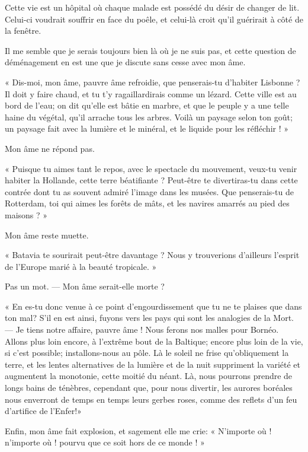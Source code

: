 Cette vie est un hôpital où chaque malade est possédé du désir de
changer de lit. Celui{}-ci voudrait souffrir en face du poêle, et
celui{}-là croit qu’il guérirait à côté de la fenêtre.

Il me semble que je serais toujours bien là où je ne suis pas, et cette
question de déménagement en est une que je discute sans cesse avec mon
âme.

« Dis{}-moi, mon âme, pauvre âme refroidie, que penserais{}-tu
d’habiter Lisbonne ? Il doit y faire chaud, et tu
t’y ragaillardirais comme un lézard. Cette ville est
au bord de l’eau; on dit qu’elle est
bâtie en marbre, et que le peuple y a une telle haine du végétal,
qu’il arrache tous les arbres. Voilà un paysage selon
ton goût; un paysage fait avec la lumière et le minéral, et le liquide
pour les réfléchir ! »

Mon âme ne répond pas.

« Puisque tu aimes tant le repos, avec le spectacle du mouvement,
veux{}-tu venir habiter la Hollande, cette terre béatifiante ?
Peut{}-être te divertiras{}-tu dans cette contrée dont tu as souvent
admiré l’image dans les musées. Que penserais{}-tu de
Rotterdam, toi qui aimes les forêts de mâts, et les navires amarrés au
pied des maisons ? »

Mon âme reste muette.

« Batavia te sourirait peut{}-être davantage ? Nous y trouverions
d’ailleurs l’esprit de
l’Europe marié à la beauté tropicale. »

Pas un mot. --- Mon âme serait{}-elle morte ?

« En es{}-tu donc venue à ce point d’engourdissement
que tu ne te plaises que dans ton mal? S’il en est
ainsi, fuyons vers les pays qui sont les analogies de la Mort. --- Je
tiens notre affaire, pauvre âme ! Nous ferons nos malles pour Bornéo.
Allons plus loin encore, à l’extrême bout de la
Baltique; encore plus loin de la vie, si c’est
possible; installons{}-nous au pôle. Là le soleil ne frise
qu’obliquement la terre, et les lentes alternatives de
la lumière et de la nuit suppriment la variété et augmentent la
monotonie, cette moitié du néant. Là, nous pourrons prendre de longs
bains de ténèbres, cependant que, pour nous divertir, les aurores
boréales nous enverront de temps en temps leurs gerbes roses, comme des
reflets d’un feu d’artifice de
l’Enfer!»

Enfin, mon âme fait explosion, et sagement elle me crie: «
N’importe où ! n’importe où ! pourvu
que ce soit hors de ce monde ! »


